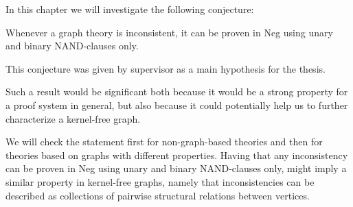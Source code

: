 In this chapter we will investigate the following conjecture:
\begin{conjecture}
  Whenever a graph theory is inconsistent, it can be proven in Neg using unary and binary NAND-clauses only.
\end{conjecture}
This conjecture was given by supervisor as a main hypothesis for the thesis.

Such a result would be significant both because it would be a strong property for a proof system in general, but also because it could potentially help us to further characterize a kernel-free graph.

We will check the statement first for non-graph-based theories and then for theories based on graphs with different properties.
Having that any inconsistency can be proven in Neg using unary and binary NAND-clauses only, might imply a similar property in kernel-free graphs, namely that inconsistencies can be described as collections of pairwise structural relations between vertices.
